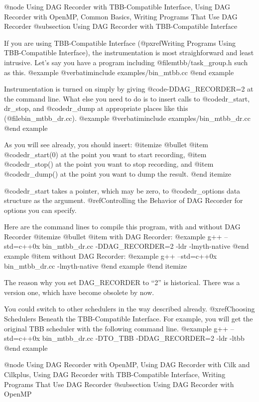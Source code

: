 @node Using DAG Recorder with TBB-Compatible Interface, Using DAG Recorder with OpenMP, Common Basics, Writing Programs That Use DAG Recorder
@subsection Using DAG Recorder with TBB-Compatible Interface

If you are using TBB-Compatible Interface (@pxref{Writing Programs Using TBB-Compatible Interface}), the instrumentation is most straighforward and least intrusive.  Let's say you have a program including @file{mtbb/task_group.h} such as this.
@example
@verbatiminclude examples/bin_mtbb.cc
@end example

Instrumentation is turned on simply by giving @code{-DDAG_RECORDER=2} at the command line.  What else you need to do is to insert calls to @code{dr_start, dr_stop,} and @code{dr_dump} at appropriate places like this  (@file{bin_mtbb_dr.cc}).
@example
@verbatiminclude examples/bin_mtbb_dr.cc
@end example

As you will see already, you should insert:
@itemize @bullet
@item @code{dr_start(0)} at the point you want to start recording,
@item @code{dr_stop()} at the point you want to stop recording, and
@item @code{dr_dump()} at the point you want to dump the result.
@end itemize

@code{dr_start} takes a pointer, which may be zero, to @code{dr_options} data structure as the argument.  
@ref{Controlling the Behavior of DAG Recorder} for options you can specify.

Here are the command lines to compile this program, with and without DAG Recorder
@itemize @bullet
@item with DAG Recorder:
@example
g++ --std=c++0x bin_mtbb_dr.cc -DDAG_RECORDER=2 -ldr -lmyth-native 
@end example
@item without DAG Recorder:
@example
g++ --std=c++0x bin_mtbb_dr.cc -lmyth-native
@end example
@end itemize

The reason why you set DAG_RECORDER to ``2'' is historical.  There was a version one, which have become obsolete by now.

You could switch to other schedulers in the way described already. @xref{Choosing Schedulers Beneath the TBB-Compatible Interface}.  For example, you will get the original TBB scheduler with the following command line.
@example
g++ --std=c++0x bin_mtbb_dr.cc -DTO_TBB -DDAG_RECORDER=2 -ldr -ltbb 
@end example

@node Using DAG Recorder with OpenMP, Using DAG Recorder with Cilk and Cilkplus, Using DAG Recorder with TBB-Compatible Interface, Writing Programs That Use DAG Recorder
@subsection Using DAG Recorder with OpenMP

